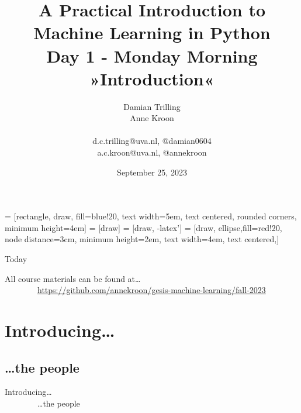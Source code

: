 \documentclass[compress]{beamer}
\title[Big Data and Automated Content Analysis]{\textbf{A Practical Introduction to Machine Learning in Python} \\Day 1 - Monday  Morning\\ »Introduction«}
\author[Damian Trilling, Anne Kroon]{Damian Trilling \\ Anne Kroon \\ ~ \\ \footnotesize{d.c.trilling@uva.nl, @damian0604 \\a.c.kroon@uva.nl, @annekroon} \\}
\date{September 25, 2023}
\institute[Gesis]{Gesis}
\begin{document}
 = [rectangle, draw, fill=blue!20, 
text width=5em, text centered, rounded corners, minimum height=4em]
 = [draw]
 = [draw, -latex']
 = [draw, ellipse,fill=red!20, node distance=3cm,
minimum height=2em, text width=4em, text centered,]




\begin{frame}{}
\titlepage
\end{frame}

\begin{frame}{Today}
\tableofcontents
\end{frame}


\begin{frame} 
All course materials can be found at\ldots \\
~~~~~~~~\url{https://github.com/annekroon/gesis-machine-learning/fall-2023}
\end{frame}

\section{Introducing\ldots}
\subsection{\ldots the people}

\begin{frame} 
Introducing\ldots \\
~~~~~~~~\ldots the people
\end{frame}
\end{document}
